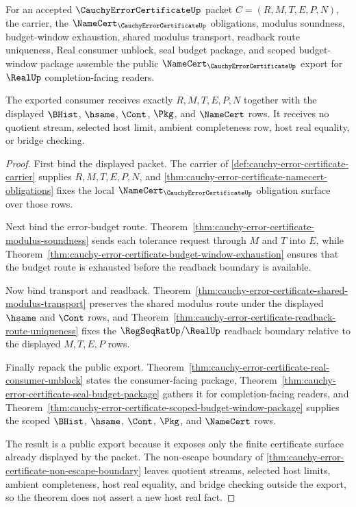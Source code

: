 \begin{theorem}
\label{thm:cauchy-error-certificate-public-export}
For an accepted $\CauchyErrorCertificateUp$ packet $C=(R,M,T,E,P,N)$, the carrier, the $\NameCert_{\CauchyErrorCertificateUp}$ obligations, modulus soundness, budget-window exhaustion, shared modulus transport, readback route uniqueness, Real consumer unblock, seal budget package, and scoped budget-window package assemble the public $\NameCert_{\CauchyErrorCertificateUp}$ export for $\RealUp$ completion-facing readers.

The exported consumer receives exactly $R,M,T,E,P,N$ together with the displayed $\BHist$, $\hsame$, $\Cont$, $\Pkg$, and $\NameCert$ rows. It receives no quotient stream, selected host limit, ambient completeness row, host real equality, or bridge checking.
\end{theorem}
\begin{proof}
First bind the displayed packet. The carrier of \autoref{def:cauchy-error-certificate-carrier} supplies $R,M,T,E,P,N$, and \autoref{thm:cauchy-error-certificate-namecert-obligations} fixes the local $\NameCert_{\CauchyErrorCertificateUp}$ obligation surface over those rows.

Next bind the error-budget route. Theorem~\ref{thm:cauchy-error-certificate-modulus-soundness} sends each tolerance request through $M$ and $T$ into $E$, while Theorem~\ref{thm:cauchy-error-certificate-budget-window-exhaustion} ensures that the budget route is exhausted before the readback boundary is available.

Now bind transport and readback. Theorem~\ref{thm:cauchy-error-certificate-shared-modulus-transport} preserves the shared modulus route under the displayed $\hsame$ and $\Cont$ rows, and Theorem~\ref{thm:cauchy-error-certificate-readback-route-uniqueness} fixes the $\RegSeqRatUp/\RealUp$ readback boundary relative to the displayed $M,T,E,P$ rows.

Finally repack the public export. Theorem~\ref{thm:cauchy-error-certificate-real-consumer-unblock} states the consumer-facing package, Theorem~\ref{thm:cauchy-error-certificate-seal-budget-package} gathers it for completion-facing readers, and Theorem~\ref{thm:cauchy-error-certificate-scoped-budget-window-package} supplies the scoped $\BHist$, $\hsame$, $\Cont$, $\Pkg$, and $\NameCert$ rows.

The result is a public export because it exposes only the finite certificate surface already displayed by the packet. The non-escape boundary of \autoref{thm:cauchy-error-certificate-non-escape-boundary} leaves quotient streams, selected host limits, ambient completeness, host real equality, and bridge checking outside the export, so the theorem does not assert a new host real fact.
\end{proof}

